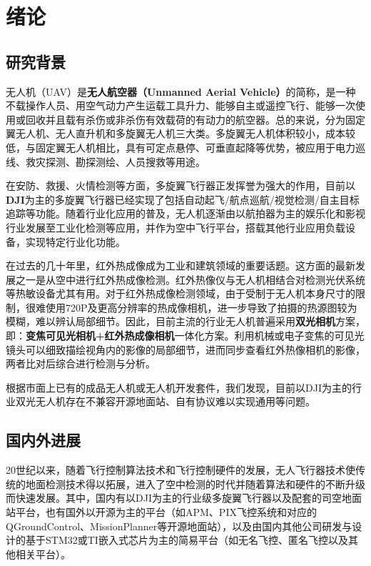 \chapter{绪论}
\section{研究背景}

无人机（UAV）是\textbf{无人航空器（Unmanned Aerial Vehicle）}的简称，是一种不载操作人员、用空气动力产生运载工具升力、能够自主或遥控飞行、能够一次使用或回收并且载有杀伤或非杀伤有效载荷的有动力的航空器。总的来说，分为固定翼无人机、无人直升机和多旋翼无人机三大类。多旋翼无人机体积较小，成本较低，与固定翼无人机相比，具有可定点悬停、可垂直起降等优势，被应用于电力巡线、救灾探测、勘探测绘、人员搜救等用途。

在安防、救援、火情检测等方面，多旋翼飞行器正发挥誉为强大的作用，目前以\textbf{DJI}为主的多旋翼飞行器已经实现了包括自动起飞/航点巡航/视觉检测/自主目标追踪等功能。随着行业化应用的普及，无人机逐渐由以航拍器为主的娱乐化和影视行业发展至工业化检测等应用，并作为空中飞行平台，搭载其他行业应用负载设备，实现特定行业化功能。

在过去的几十年里，红外热成像成为工业和建筑领域的重要话题。这方面的最新发展之一是从空中进行红外热成像检测。红外热像仪与无人机相结合对检测光伏系统等热敏设备尤其有用。对于红外热成像检测领域，由于受制于无人机本身尺寸的限制，很难使用720P及更高分辨率的热成像相机，进一步导致了拍摄的热源图较为模糊，难以辨认局部细节。因此，目前主流的行业无人机普遍采用\textbf{双光相机}方案，即：\textbf{变焦可见光相机+红外热成像相机}一体化方案。利用机械或电子变焦的可见光镜头可以细致描绘视角内的影像的局部细节，进而同步查看红外热像相机的影像，两者比对后综合进行检测与分析。

根据市面上已有的成品无人机或无人机开发套件，我们发现，目前以DJI为主的行业双光无人机存在不兼容开源地面站、自有协议难以实现通用等问题。

\section{国内外进展}

20世纪以来，随着飞行控制算法技术和飞行控制硬件的发展，无人飞行器技术使传统的地面检测技术得以拓展，进入了空中检测的时代并随着算法和硬件的不断升级而快速发展\cite{Net3}。其中，国内有以DJI为主的行业级多旋翼飞行器以及配套的司空地面站平台，也有国外以开源为主的平台（如APM、PIX飞控系统和对应的QGroundControl、MissionPlanner等开源地面站），以及由国内其他公司研发与设计的基于STM32或TI嵌入式芯片为主的简易平台（如无名飞控、匿名飞控以及其他相关平台）。

